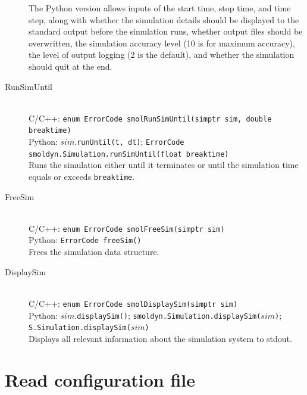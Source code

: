 \documentclass {scrbook}
\newcommand {\ttt} {\texttt}
\begin{document}
\begin{description}
The Python version allows inputs of the start time, stop time, and time step, along with whether the simulation details should be displayed to the standard output before the simulation runs, whether output files should be overwritten, the simulation accuracy level (10 is for maximum accuracy), the level of output logging (2 is the default), and whether the simulation should quit at the end.

\item[RunSimUntil]
\hfill \\
C/C++: \ttt{enum ErrorCode smolRunSimUntil(simptr sim, double breaktime)}\\
Python: $sim$.\ttt{runUntil(t, dt)}; \ttt{ErrorCode smoldyn.Simulation.runSimUntil(float breaktime)}\\
Runs the simulation either until it terminates or until the simulation time equals or exceeds \ttt{breaktime}.

\item[FreeSim]
\hfill \\
C/C++: \ttt{enum ErrorCode smolFreeSim(simptr sim)}\\
Python: \ttt{ErrorCode freeSim()}\\
Frees the simulation data structure.

\item[DisplaySim]
\hfill \\
C/C++: \ttt{enum ErrorCode smolDisplaySim(simptr sim)}\\
Python: $sim$.\ttt{displaySim()}; \ttt{smoldyn.Simulation.displaySim($sim$)}; \ttt{S.Simulation.displaySim($sim$)}\\
Displays all relevant information about the simulation system to stdout.

\end{description}

\section{Read configuration file}
\end{document}
